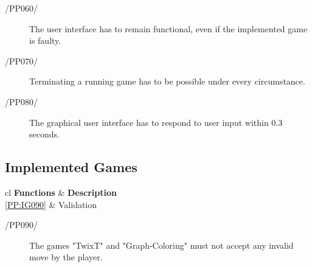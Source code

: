 \begin{description}
	\item[{/PP060/}\label{PP:GE060}] The user interface has to remain functional, even if the implemented game is faulty.
	\item[{/PP070/}\label{PP:GE070}] Terminating a running game has to be possible under every circumstance. 
	\item[{/PP080/}\label{PP:GE080}] The graphical user interface has to respond to user input within 0.3 seconds.
\end{description}

\subsection{Implemented Games}

\begin{tabular}{{c}{l}}
    \hline
    {\bf Functions} & {\bf Description} \\ \hline
	\ref{PP:IG090} & Validation\\ \hline
\end{tabular}

\begin{description}
	\item[{/PP090/}\label{PP:IG090}] The games "TwixT" and "Graph-Coloring" must not accept any invalid move by the player.
\end{description}